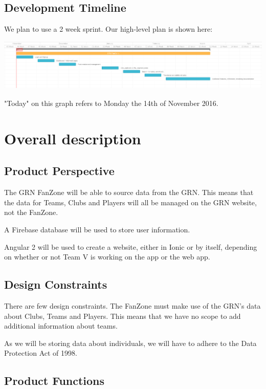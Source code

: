\documentclass[10pt,a4paper]{article}
\begin{document}
\newpage

\subsection{Development Timeline}

We plan to use a 2 week sprint. Our high-level plan is shown here:

\includegraphics[width=\textwidth]{ganttchart}

"Today" on this graph refers to Monday the 14th of November 2016.


\newpage
\section{Overall description}

\subsection{Product Perspective}
The GRN FanZone will be able to source data from the GRN. This means that the data for Teams, Clubs and Players will all be managed on the GRN website, not the FanZone. 


A Firebase database will be used to store user information.


Angular 2 will be used to create a website, either in Ionic or by itself, depending on whether or not Team V is working on the app or the web app.

\subsection{Design Constraints}

There are few design constraints. The FanZone must make use of the GRN's data about Clubs, Teams and Players. This means that we have no scope to add additional information about teams. 

As we will be storing data about individuals, we will have to adhere to the Data Protection Act of 1998.


\subsection{Product Functions}
\end{document}
